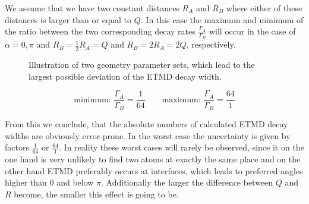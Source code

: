We assume that we have two constant distances $R_{A}$ and $R_B$
where either of these distances is larger than or equal to $Q$.
In this case the maximum and minimum of the ratio between the two
corresponding decay rates $\frac{\Gamma_{A}}{\Gamma_B}$ will occur
in the case of $\alpha = 0,\pi$ and $R_B = \frac 12 R_{A} = Q$
and $R_B = 2 R_{A} = 2Q$, respectively.

\begin{figure}[h]
 \centering
 
 \caption{Illustration of two geometry parameter sets, which lead
          to the largest possible deviation of the ETMD decay width.}
 \label{}
\end{figure}

\begin{equation}
\text{minimum: } \frac{\Gamma_{A}}{\Gamma_B}= \frac{1}{64} \quad\quad
\text{maximum: } \frac{\Gamma_{A}}{\Gamma_B}= \frac{64}{1}
\end{equation}

From this we conclude, that the absolute numbers of calculated ETMD
decay widths are obviously error-prone. In the worst case the uncertainty
is given by factors $\frac{1}{64}$ or $\frac{64}{1}$.
In reality these worst cases will rarely be observed, since it on
the one hand is very unlikely to find two atoms at exactly the same place
and on the other hand ETMD preferably occurs at interfaces, which leads
to preferred angles higher than 0 and below $\pi$.
Additionally the larger the difference between $Q$ and $R$ become, the
smaller this effect is going to be.


